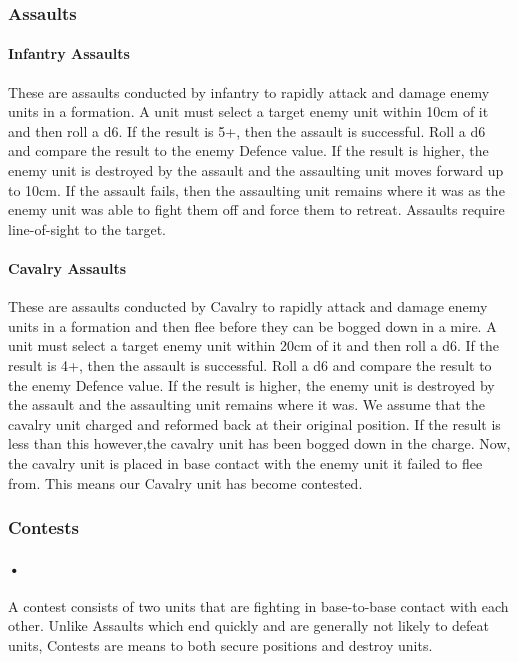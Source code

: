 \documentclass[12pt]{article}
\begin{document}
\subsubsection{Assaults}
\paragraph{Infantry Assaults}
These are assaults conducted by infantry to rapidly attack and damage enemy units in a formation. A unit must select a target enemy unit within 10cm of it and then roll a d6. If the result is 5+, then the assault is successful. Roll a d6 and compare the result to the enemy Defence value. If the result is higher, the enemy unit is destroyed by the assault and the assaulting unit moves forward up to 10cm. If the assault fails, then the assaulting unit remains where it was as the enemy unit was able to fight them off and force them to retreat. Assaults require line-of-sight to the target.
\paragraph{Cavalry Assaults}
These are assaults conducted by Cavalry to rapidly attack and damage enemy units in a formation and then flee before they can be bogged down in a mire. A unit must select a target enemy unit within 20cm of it and then roll a d6. If the result is 4+, then the assault is successful. Roll a d6 and compare the result to the enemy Defence value. If the result is higher, the enemy unit is destroyed by the assault and the assaulting unit remains where it was. We assume that the cavalry unit charged and reformed back at their original position. If the result is less than this however,the cavalry unit has been bogged down in the charge. Now, the cavalry unit is placed in base contact with the enemy unit it failed to flee from. This means our Cavalry unit has become contested.

\subsubsection{Contests}
\paragraph{•}
A contest consists of two units that are fighting in base-to-base contact with each other. Unlike Assaults which end quickly and are generally not likely to defeat units, Contests are means to both secure positions and destroy units.
\end{document}
